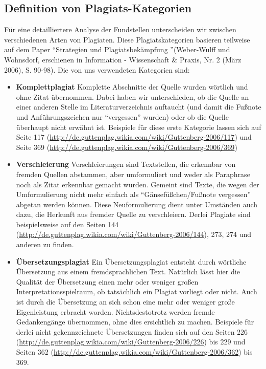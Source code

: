 \documentclass[ngerman,final,fontsize=12pt,paper=a4,twoside,BCOR=8mm,draft=false]{scrartcl}
\begin{document}
\subsection{Definition von Plagiats-Kategorien}
Für eine detailliertere Analyse der Fundstellen unterscheiden wir zwischen verschiedenen Arten von Plagiaten. Diese Plagiatskategorien basieren teilweise auf dem Paper \textquotedblleft Strategien und Plagiatsbekämpfung \textquotedblright (Weber-Wulff und Wohnsdorf, erschienen in Information - Wissenschaft \& Praxis, Nr. 2 (März 2006), S. 90-98).
Die von uns verwendeten Kategorien sind:
\begin{itemize}
\item \textbf{Komplettplagiat} 
Komplette Abschnitte der Quelle wurden wörtlich und ohne Zitat übernommen. Dabei haben wir unterschieden, ob die Quelle an einer anderen Stelle im Literaturverzeichnis auftaucht (und damit die Fußnote und Anführungszeichen nur "`vergessen"' wurden) oder ob die Quelle überhaupt nicht erwähnt ist. Beispiele für diese erste Kategorie lassen sich auf Seite 117 (\url{http://de.guttenplag.wikia.com/wiki/Guttenberg-2006/117}) und Seite 369 (\url{http://de.guttenplag.wikia.com/wiki/Guttenberg-2006/369})

\item \textbf{Verschleierung} 
Verschleierungen sind Textstellen, die erkennbar von fremden Quellen abstammen, aber umformuliert und weder als Paraphrase noch als Zitat erkennbar gemacht wurden. Gemeint sind Texte, die wegen der Umformulierung nicht mehr einfach als "`Gänsefüßchen/Fußnote vergessen"' abgetan werden können. Diese Neuformulierung dient unter Umständen auch dazu, die Herkunft aus fremder Quelle zu verschleiern. Derlei Plagiate sind beispielsweise auf den Seiten 144 (\url{http://de.guttenplag.wikia.com/wiki/Guttenberg-2006/144}), 273, 274 und anderen zu finden.

\item \textbf{Übersetzungsplagiat} 
Ein Übersetzungsplagiat entsteht durch wörtliche Übersetzung aus einem fremdsprachlichen Text. Natürlich lässt hier die Qualität der Übersetzung einen mehr oder weniger großen Interpretationsspielraum, ob tatsächlich ein Plagiat vorliegt oder nicht. Auch ist durch die Übersetzung an sich schon eine mehr oder weniger große Eigenleistung erbracht worden. Nichtsdestotrotz werden fremde Gedankengänge übernommen, ohne dies ersichtlich zu machen. Beispiele für derlei nicht gekennzeichnete Übersetzungen finden sich auf den Seiten 226 (\url{http://de.guttenplag.wikia.com/wiki/Guttenberg-2006/226}) bis 229 und Seiten 362 (\url{http://de.guttenplag.wikia.com/wiki/Guttenberg-2006/362}) bis 369.


\end{itemize}
\end{document}
